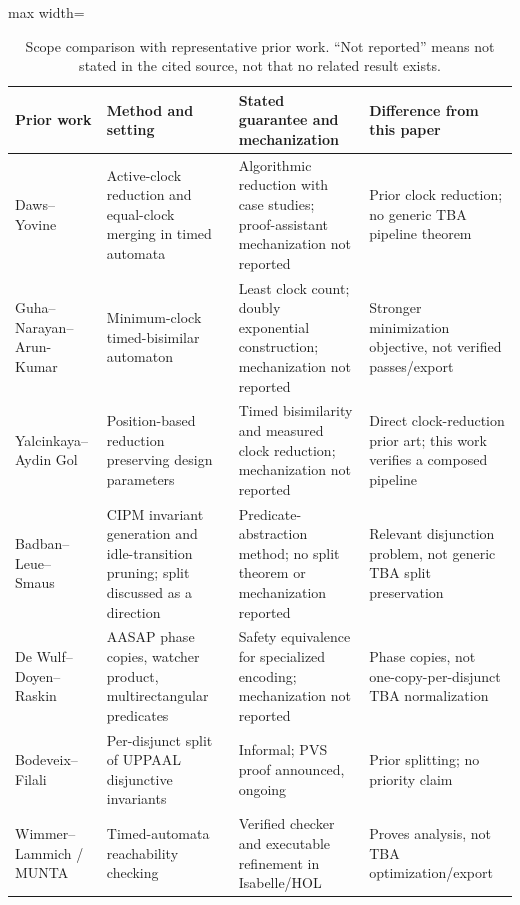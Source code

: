\begin{table}[t]
\centering
\caption{Scope comparison with representative prior work. ``Not reported'' means not stated in the cited source, not that no related result exists.}
\label{tab:related-work}
\small
\setlength{\tabcolsep}{3pt}
\begin{adjustbox}{max width=\textwidth}\begin{tabular}{@{}>{\raggedright\arraybackslash}p{}>{\raggedright\arraybackslash}p{}>{\raggedright\arraybackslash}p{}>{\raggedright\arraybackslash}p{}@{}}
\toprule
Prior work & Method and setting & Stated guarantee and mechanization & Difference from this paper\\
\midrule
Daws--Yovine~\cite{daws_yovine_rtss1996} & Active-clock reduction and equal-clock merging in timed automata & Algorithmic reduction with case studies; proof-assistant mechanization not reported & Prior clock reduction; no generic TBA pipeline theorem\\
Guha--Narayan--Arun-Kumar~\cite{guha_narayan_arunkumar_concur2014} & Minimum-clock timed-bisimilar automaton & Least clock count; doubly exponential construction; mechanization not reported & Stronger minimization objective, not verified passes/export\\
Yalcinkaya--Aydin Gol~\cite{yalcinkaya_aydin_gol_formalise2019} & Position-based reduction preserving design parameters & Timed bisimilarity and measured clock reduction; mechanization not reported & Direct clock-reduction prior art; this work verifies a composed pipeline\\
Badban--Leue--Smaus~\cite{badban_etal_wing2010} & CIPM invariant generation and idle-transition pruning; split discussed as a direction & Predicate-abstraction method; no split theorem or mechanization reported & Relevant disjunction problem, not generic TBA split preservation\\
De Wulf--Doyen--Raskin~\cite{de_wulf_doyen_raskin_fm2005} & AASAP phase copies, watcher product, multirectangular predicates & Safety equivalence for specialized encoding; mechanization not reported & Phase copies, not one-copy-per-disjunct TBA normalization\\
Bodeveix--Filali~\cite{[BF03]} & Per-disjunct split of UPPAAL disjunctive invariants & Informal; PVS proof announced, ongoing & Prior splitting; no priority claim\\
Wimmer--Lammich / MUNTA~\cite{munta_tacas18,munta_formats19} & Timed-automata reachability checking & Verified checker and executable refinement in Isabelle/HOL & Proves analysis, not TBA optimization/export\\

\end{tabular}
\end{adjustbox}
\end{table}
